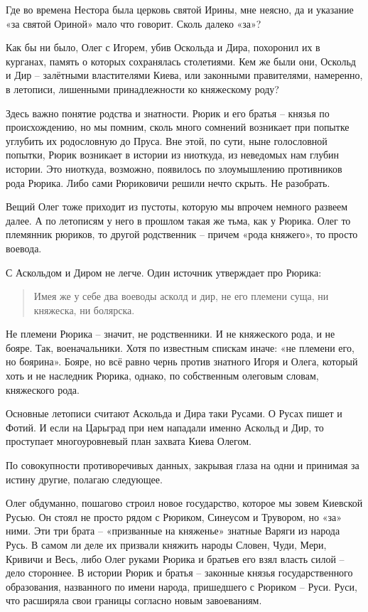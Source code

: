 Где во времена Нестора была церковь святой Ирины, мне неясно, да и указание «за святой Ориной» мало что говорит. Сколь далеко «за»?

Как бы ни было, Олег с Игорем, убив Оскольда и Дира, похоронил их в курганах, память о которых сохранялась столетиями. Кем же были они, Оскольд и Дир – залётными властителями Киева, или законными правителями, намеренно, в летописи, лишенными принадлежности ко княжескому роду?

Здесь важно понятие родства и знатности. Рюрик и его братья – князья по происхождению, но мы помним, сколь много сомнений возникает при попытке углубить их родословную до Пруса. Вне этой, по сути, ныне голословной попытки, Рюрик возникает в истории из ниоткуда, из неведомых нам глубин истории. Это ниоткуда, возможно, появилось по злоумышлению противников рода Рюрика. Либо сами Рюриковичи решили нечто скрыть. Не разобрать.

Вещий Олег тоже приходит из пустоты, которую мы впрочем немного развеем далее. А по летописям у него в прошлом такая же тьма, как у Рюрика. Олег то племянник рюриков, то другой родственник – причем «рода княжего», то просто воевода.

С Аскольдом и Диром не легче. Один источник утверждает про Рюрика:

\begin{quotation}
Имея же у себе два воеводы асколд и дир, не его племени суща, ни княжеска, ни болярска.
\end{quotation}

Не племени Рюрика – значит, не родственники. И не княжеского рода, и не бояре. Так, военачальники. Хотя по известным спискам иначе: «не племени его, но боярина». Бояре, но всё равно чернь против знатного Игоря и Олега, который хоть и не наследник Рюрика, однако, по собственным олеговым словам, княжеского рода.

Основные летописи считают Аскольда и Дира таки Русами. О Русах пишет и Фотий. И если на Царьград при нем нападали именно Аскольд и Дир, то проступает многоуровневый план захвата Киева Олегом.

По совокупности противоречивых данных, закрывая глаза на одни и принимая за истину другие, полагаю следующее.

Олег обдуманно, пошагово строил новое государство, которое мы зовем Киевской Русью. Он стоял не просто рядом с Рюриком, Синеусом и Трувором, но «за» ними. Эти три брата – «призванные на княженье» знатные Варяги из народа Русь. В самом ли деле их призвали княжить народы Словен, Чуди, Мери, Кривичи и Весь, либо Олег руками Рюрика и братьев его взял власть силой – дело стороннее. В истории Рюрик и братья – законные князья государственного образования, названного по имени народа, пришедшего с Рюриком – Руси. Руси, что расширяла свои границы согласно новым завоеваниям.

